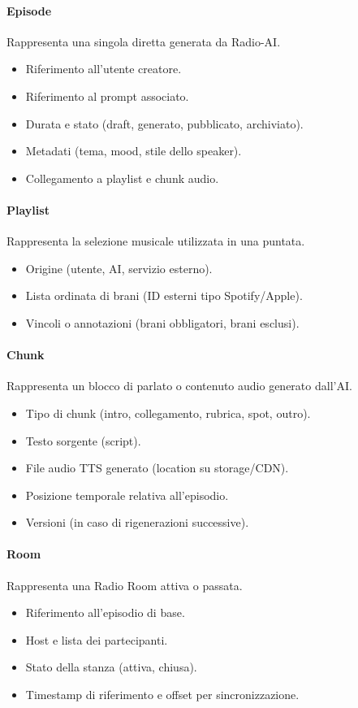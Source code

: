 \documentclass[11pt,a4paper]{article}
\begin{document}
\paragraph{Episode}
Rappresenta una singola diretta generata da Radio-AI.
\begin{itemize}
    \item Riferimento all’utente creatore.
    \item Riferimento al prompt associato.
    \item Durata e stato (draft, generato, pubblicato, archiviato).
    \item Metadati (tema, mood, stile dello speaker).
    \item Collegamento a playlist e chunk audio.
\end{itemize}

\paragraph{Playlist}
Rappresenta la selezione musicale utilizzata in una puntata.
\begin{itemize}
    \item Origine (utente, AI, servizio esterno).
    \item Lista ordinata di brani (ID esterni tipo Spotify/Apple).
    \item Vincoli o annotazioni (brani obbligatori, brani esclusi).
\end{itemize}

\paragraph{Chunk}
Rappresenta un blocco di parlato o contenuto audio generato dall’AI.
\begin{itemize}
    \item Tipo di chunk (intro, collegamento, rubrica, spot, outro).
    \item Testo sorgente (script).
    \item File audio TTS generato (location su storage/CDN).
    \item Posizione temporale relativa all’episodio.
    \item Versioni (in caso di rigenerazioni successive).
\end{itemize}

\paragraph{Room}
Rappresenta una Radio Room attiva o passata.
\begin{itemize}
    \item Riferimento all’episodio di base.
    \item Host e lista dei partecipanti.
    \item Stato della stanza (attiva, chiusa).
    \item Timestamp di riferimento e offset per sincronizzazione.
\end{itemize}
\end{document}
